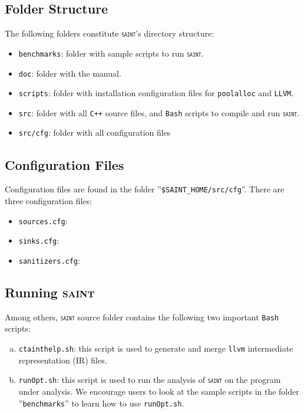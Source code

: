 \documentclass[12pt,onecolumn,a4paper]{article}
\newcommand{\saint}{\texttt{\textsc{saint}}\xspace}
\newcommand{\tool}[1]{\texttt{#1}\xspace}
\begin{document}
\subsection{Folder Structure}
The following folders constitute \saint's directory structure:
\begin{itemize}
	\item \texttt{benchmarks}: folder with sample
	scripts to run \saint.

	\item \texttt{doc}: folder with the manual.

	\item \texttt{scripts}: folder with installation
	configuration files for \tool{poolalloc} and \tool{LLVM}.
	
	\item \texttt{src}: folder with all \texttt{C++} source files,
	and \tool{Bash} scripts to compile and run \saint.

	\item \texttt{src/cfg}: folder with all configuration files			
\end{itemize}

\subsection{Configuration Files}

Configuration files are found in the folder ''\texttt{\$SAINT\_HOME/src/cfg}''.
There are three configuration files:
\begin{itemize}
	\item \texttt{sources.cfg}:
	\item \texttt{sinks.cfg}:
	\item \texttt{sanitizers.cfg}:
\end{itemize}

\subsection{Running \textsc{saint}}
Among others, \saint source folder contains the following two important
\texttt{Bash} scripts:
\begin{enumerate}[a)]
	\item \texttt{ctainthelp.sh}: this script is used to generate and
		merge \tool{llvm} intermediate representation (IR) files. 
	
	\item \texttt{runOpt.sh}: this script is used to run the analysis of
		\saint on the program under analysis. We encourage users to look
		at the sample scripts in the folder ''\texttt{benchmarks}'' to
		learn how to use \texttt{runOpt.sh}.
\end{enumerate}




\end{document}
